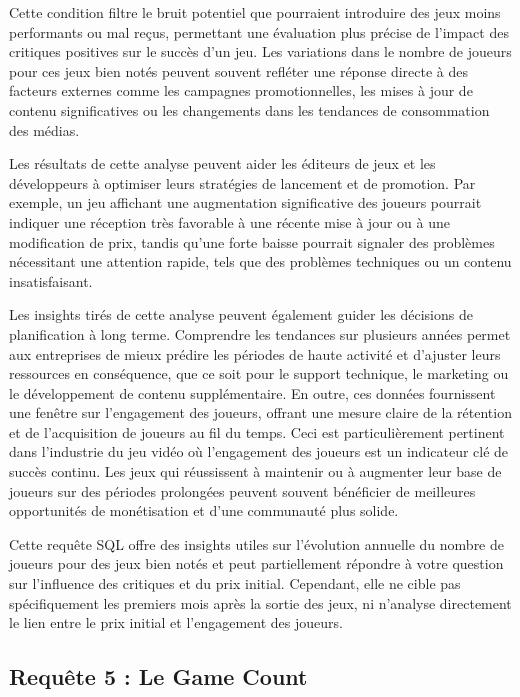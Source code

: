 \documentclass[mstat,12pt]{unswthesis}
\begin{document}
Cette condition filtre le bruit potentiel que pourraient introduire des
jeux moins performants ou mal reçus, permettant une évaluation plus
précise de l'impact des critiques positives sur le succès d'un jeu. Les
variations dans le nombre de joueurs pour ces jeux bien notés peuvent
souvent refléter une réponse directe à des facteurs externes comme les
campagnes promotionnelles, les mises à jour de contenu significatives ou
les changements dans les tendances de consommation des médias.

Les résultats de cette analyse peuvent aider les éditeurs de jeux et les
développeurs à optimiser leurs stratégies de lancement et de promotion.
Par exemple, un jeu affichant une augmentation significative des joueurs
pourrait indiquer une réception très favorable à une récente mise à jour
ou à une modification de prix, tandis qu'une forte baisse pourrait
signaler des problèmes nécessitant une attention rapide, tels que des
problèmes techniques ou un contenu insatisfaisant.

Les insights tirés de cette analyse peuvent également guider les
décisions de planification à long terme. Comprendre les tendances sur
plusieurs années permet aux entreprises de mieux prédire les périodes de
haute activité et d'ajuster leurs ressources en conséquence, que ce soit
pour le support technique, le marketing ou le développement de contenu
supplémentaire. En outre, ces données fournissent une fenêtre sur
l'engagement des joueurs, offrant une mesure claire de la rétention et
de l'acquisition de joueurs au fil du temps. Ceci est particulièrement
pertinent dans l'industrie du jeu vidéo où l'engagement des joueurs est
un indicateur clé de succès continu. Les jeux qui réussissent à
maintenir ou à augmenter leur base de joueurs sur des périodes
prolongées peuvent souvent bénéficier de meilleures opportunités de
monétisation et d'une communauté plus solide.

Cette requête SQL offre des insights utiles sur l'évolution annuelle du
nombre de joueurs pour des jeux bien notés et peut partiellement
répondre à votre question sur l'influence des critiques et du prix
initial. Cependant, elle ne cible pas spécifiquement les premiers mois
après la sortie des jeux, ni n'analyse directement le lien entre le prix
initial et l'engagement des joueurs.

\newpage

\hypertarget{requuxeate-5-le-game-count}{%
\subsection{Requête 5 : Le Game
Count}\label{requuxeate-5-le-game-count}}
\end{document}
